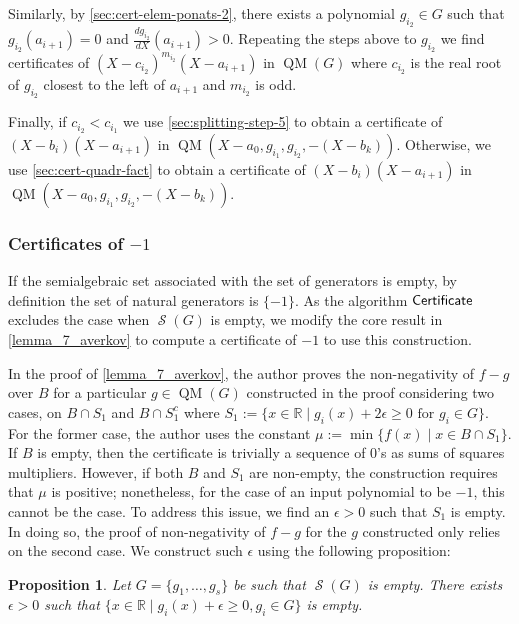 \documentclass[preprint,12pt,authoryear]{elsarticle}
\newtheorem{proposition}[theorem]{Proposition}
\DeclareMathOperator{\quadmod}{QM}
\DeclareMathOperator{\semialgebraic}{\mathcal{S}}
\DeclareMathOperator{\algPutinar}{\sf Certificate}
\begin{document}
Similarly, by \th\ref{sec:cert-elem-ponats-2}, there exists a polynomial
$g_{i_2} \in G$ such that $g_{i_2}(a_{i+1}) = 0$ and
$\frac{d g_{i_2}}{d X}(a_{i+1}) > 0$. Repeating the steps above to $g_{i_2}$ we
find certificates of $(X - c_{i_2})^{m_{i_2}}(X - a_{i+1})$ in $\quadmod(G)$
where $c_{i_2}$ is the real root of $g_{i_2}$ closest to the left of $a_{i+1}$
and $m_{i_2}$ is odd.

Finally, if $c_{i_2} < c_{i_1}$ we use \th\ref{sec:splitting-step-5} to obtain a
certificate of $(X - b_i)(X - a_{i+1})$ in
$\quadmod(X - a_0, g_{i_1}, g_{i_2}, -(X - b_k))$. Otherwise, we use
\th\ref{sec:cert-quadr-fact} to obtain a certificate of
$(X - b_i)(X - a_{i+1})$ in $\quadmod(X - a_0, g_{i_1}, g_{i_2}, -(X - b_k))$.

 \subsubsection{Certificates of $-1$}

If the semialgebraic set associated with the set of generators is empty, by
definition the set of natural generators is $\{-1\}$. As the algorithm 
$\algPutinar$ excludes the case when $\semialgebraic(G)$ is empty, we modify the
core result in \th\ref{lemma_7_averkov} to compute a certificate of $-1$ to use
this construction.

In the proof of \th\ref{lemma_7_averkov}, the author proves the non-negativity
of $f - g$ over $B$ for a particular $g \in \quadmod(G)$ constructed in the
proof considering two cases, on $B \cap S_1$ and $B \cap S_1^{c}$ where
$S_1 := \{x \in \mathbb{R} \mid g_i(x) + 2\epsilon \geq 0 \text{ for } g_i \in
G\}$. For the former case, the author uses the constant
$\mu := \min\{f(x) \mid x \in B \cap S_1 \}$. If $B$ is empty, then the
certificate is trivially a sequence of $0$'s as sums of squares
multipliers. However, if both $B$ and $S_1$ are non-empty, the construction
requires that $\mu$ is positive; nonetheless, for the case of an input
polynomial to be $-1$, this cannot be the case. To address this issue, we find an
$\epsilon > 0$ such that $S_1$ is empty. In doing so, the proof of non-negativity
of $f - g$ for the $g$ constructed only relies on the second case. We construct
such $\epsilon$ using the following proposition:

\begin{proposition}
 Let $G = \{g_1, \dots, g_s\}$ be such that $\semialgebraic(G)$ is empty. There
  exists $\epsilon > 0$ such that
  $\{x \in \mathbb{R} \mid g_i(x) + \epsilon \geq 0, g_i \in G\}$ is empty.
\end{proposition}
\end{document}
